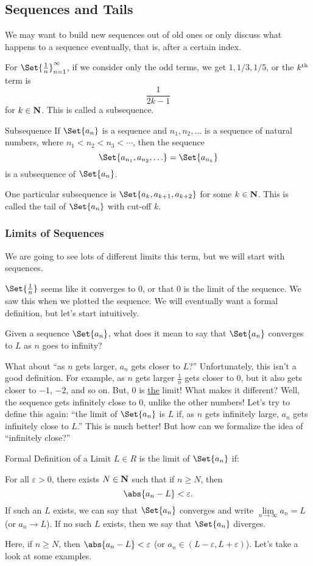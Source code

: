 \subsection{Sequences and Tails}
We may want to build new sequences out of old ones or only discuss what happens to a sequence eventually, that is, after a certain index.
\begin{Example}{}{}
    For $ \Set{\frac{1}{n}}_{n=1}^{\infty} $, if we consider only the odd terms, we get $ 1,1/3,1/5 $, or the $ k\textsuperscript{th} $
    term is
    \[ \frac{1}{2k-1} \]
    for $ k\in\mathbf{N} $.
    This is called a subsequence.
\end{Example}
\begin{Definition}{Subsequence}{}
    If $ \Set{a_n} $ is a sequence and $ {n_1,n_2,\ldots} $ is a sequence of natural numbers, where
    $ n_1<n_2<n_3<\cdots $, then the sequence
    \[ \Set{a_{n_1},a_{n_2},\ldots}=\Set{a_{n_k}} \]
    is a subsequence of $ \Set{a_n} $.
\end{Definition}
One particular subsequence is $ \Set{a_k,a_{k+1},a_{k+2}} $ for some $ k\in\mathbf{N} $.
This is called the tail of $ \Set{a_n} $ with cut-off $ k $.

\subsubsection{Limits of Sequences}
We are going to see lots of different limits this term, but we will start with sequences.
\begin{Example}{}{}
    $ \Set{\frac{1}{n}} $ seems like it converges to $ 0 $, or that $ 0 $ is the limit of the sequence.
    We saw this when we plotted the sequence. We will eventually want a formal definition, but let's start intuitively.
\end{Example}
Given a sequence $ \Set{a_n} $, what does it mean to say that $ \Set{a_n} $ converges to $ L $
as $ n $ goes to infinity?

What about ``as $ n $ gets larger, $ a_n $ gets closer to $ L $?'' Unfortunately, this isn't a good definition. For example, as $ n $
gets larger $ \frac{1}{n} $ gets closer to $ 0 $, but it also gets closer to $ -1 $, $ -2 $, and so on. But, $ 0 $
is \underline{the} limit! What makes it different? Well, the sequence gets infinitely close to $ 0 $,
unlike the other numbers! Let's try to define this again: ``the limit of $ \Set{a_n} $ is $ L $
if, as $ n $ gets infinitely large, $ a_n $ gets infinitely close to $ L $.'' This is much better!
But how can we formalize the idea of ``infinitely close?''
\begin{Definition}{Formal Definition of a Limit}{}
    $ L\in R $ is the limit of $ \Set{a_n} $ if:

    For all $ \varepsilon>0 $, there exists $ N\in \mathbf{N} $ such that if $ n\ge N $, then
    \[ \abs{a_n-L}<\varepsilon. \]
    If such an $ L $ exists, we can say that $ \Set{a_n} $ converges and write $ \lim\limits_{{n} \to {\infty}}a_n=L $ (or $ a_n\to L $).
    If no such $ L $ exists, then we say that $ \Set{a_n} $ diverges.
\end{Definition}
Here, if $ n\ge N $, then $ \abs{a_n-L}<\varepsilon $ (or $ a_n\in(L-\varepsilon,L+\varepsilon) $). Let's take a look at some examples.


